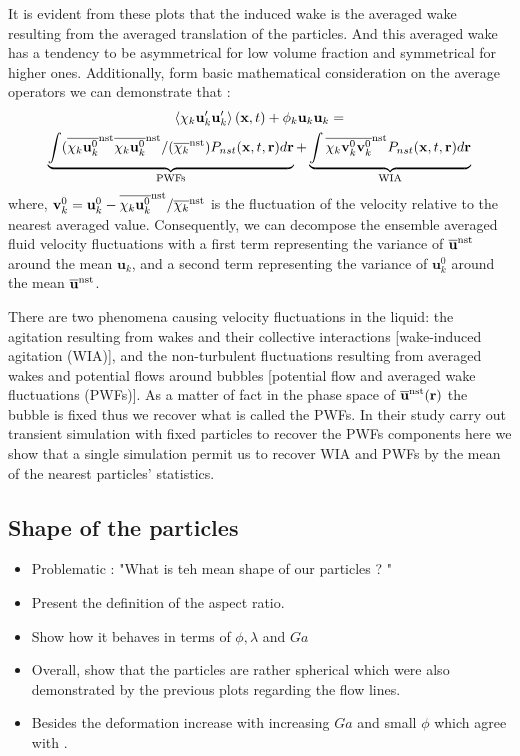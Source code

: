 It is evident from these plots that the induced wake is the averaged wake resulting from the averaged translation of the particles. 
And this averaged wake has a tendency to be asymmetrical for low volume fraction and symmetrical for higher ones. 
Additionally, form basic mathematical consideration on the average operators we can demonstrate that :
\begin{multline*}
    \left<\chi_k \textbf{u}'_k\textbf{u}'_k\right>(\textbf{x},t)
    + \phi_k \textbf{u}_k\textbf{u}_k
    = \\
    \underbrace{\int (\overline{\chi_k \textbf{u}^0_k}^\text{nst}  \overline{\chi_k \textbf{u}^0_k}^\text{nst} / (\overline{\chi_k}^\text{nst})  P_{nst}(\textbf{x},t,\textbf{r}) d\textbf{r} }_\text{PWFs}
    +\underbrace{\int \overline{\chi_k \textbf{v}_k^0\textbf{v}_k^0}^\text{nst}  P_{nst}(\textbf{x},t,\textbf{r}) d\textbf{r}}_\text{WIA}
    \label{eq:def_uu}
\end{multline*}
where, $\textbf{v}_k^0  = \textbf{u}_k^0 - \overline{\chi_k \textbf{u}^0_k}^\text{nst} / \overline{\chi_k}^\text{nst}$ is the fluctuation of the velocity relative to the nearest averaged value. 
Consequently, we can decompose the ensemble averaged fluid velocity fluctuations with a first term representing the variance of $\overline{\textbf{u}}^\text{nst}$ around the mean $\textbf{u}_k$, and a second term representing the variance of $\textbf{u}^0_k$ around the mean  $\overline{\textbf{u}}^\text{nst}$. 

There are two phenomena causing velocity fluctuations in the liquid:
the agitation resulting from wakes and their collective interactions [wake-induced agitation (WIA)], and the non-turbulent fluctuations resulting from averaged wakes and potential flows around bubbles [potential flow and averaged wake fluctuations (PWFs)].
As a matter of fact in the phase space of $\overline{\textbf{u}}^\text{nst}(\textbf{r})$ the bubble is fixed thus we recover what is called the PWFs. 
In their study \citet{du2022analysis} carry out transient simulation with fixed particles to recover the PWFs components here we show that a single simulation permit us to recover WIA and PWFs by the mean of the nearest particles' statistics. 



\subsection{Shape of the particles}
\begin{itemize}
    \item Problematic : "What is teh mean shape of our particles ? "
    \item Present the definition of the aspect ratio.
    \item Show how it behaves in terms of $\phi,\lambda$ and $Ga$
    \item Overall, show that the particles are rather spherical which were also demonstrated by the previous plots regarding the flow lines. 
    \item Besides the deformation increase with increasing $Ga$ and small $\phi$ which agree with \citet{loisy2017buoyancy}. 
\end{itemize}


